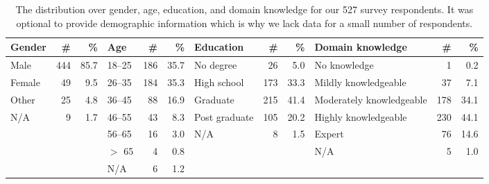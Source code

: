 \begin{table*}[t]
	\centering
	\begin{tabular}{l r r | l r r | l r r | l r r}
	\toprule
	Gender & \# & \% &
	Age & \# & \% &
	Education & \# & \% &
	Domain knowledge & \# & \% \\
	\midrule
	Male   & 444 & 85.7 & 18--25 & 186 & 35.7 & No degree     &  26 & 5.0  & No knowledge             &   1 & 0.2  \\
	Female &  49 &  9.5 & 26--35 & 184 & 35.3 & High school   & 173 & 33.3 & Mildly knowledgeable     &  37 & 7.1  \\
	Other  &  25 &  4.8 & 36--45 &  88 & 16.9 & Graduate      & 215 & 41.4 & Moderately knowledgeable & 178 & 34.1 \\
	N/A    &   9 &  1.7 & 46--55 &  43 &  8.3 & Post graduate & 105 & 20.2 & Highly knowledgeable     & 230 & 44.1 \\
	       &     &      & 56--65 &  16 &  3.0 & N/A           &   8 &  1.5 & Expert                   &  76 & 14.6 \\
	       &     &      & $>$ 65 &   4 &  0.8 &               &     &      & N/A                      &   5 &  1.0 \\
	       &     &      & N/A    &   6 &  1.2 &               &     &      &                          &     & \\
	\bottomrule
	\end{tabular}
	\caption{The distribution over gender, age, education, and domain knowledge
	for our 527 survey respondents.  It was optional to provide demographic
	information which is why we lack data for a small number of respondents.}
	\label{tab:survey-demo}
\end{table*}
